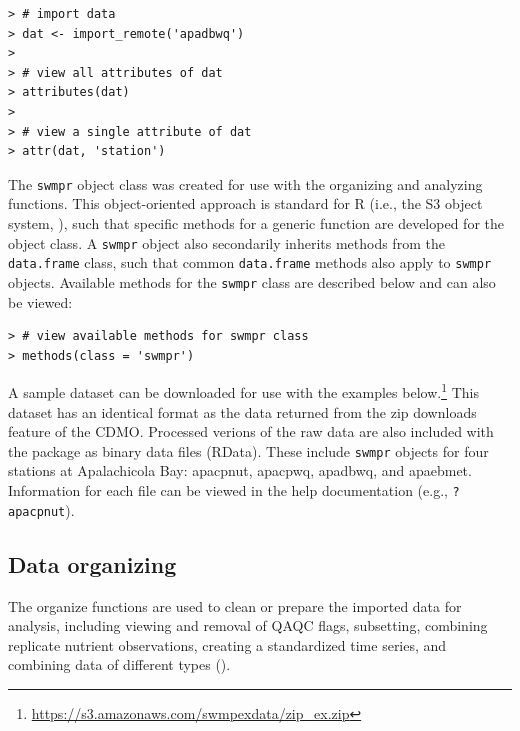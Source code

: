 \documentclass[10pt,letterpaper]{article}\usepackage[]{graphicx}\usepackage[]{color}
\makeatletter
\newenvironment{kframe}{%
 \def\at@end@of@kframe{}%
 \ifinner\ifhmode%
  \def\at@end@of@kframe{\end{minipage}}%
  \begin{minipage}{\columnwidth}%
 \fi\fi%
 \def\FrameCommand##1{\hskip\@totalleftmargin \hskip-\fboxsep
 \colorbox{shadecolor}{##1}\hskip-\fboxsep
     \hskip-\linewidth \hskip-\@totalleftmargin \hskip\columnwidth}%
 \MakeFramed {\advance\hsize-\width
   \@totalleftmargin\z@ \linewidth\hsize
   \@setminipage}}%
 {\par\unskip\endMakeFramed%
 \at@end@of@kframe}
\newenvironment{knitrout}{}{} %
\makeatother
\begin{document}
\begin{knitrout}\small
{}\color{fgcolor}\begin{kframe}
\begin{verbatim}
> # import data
> dat <- import_remote('apadbwq')
>  
> # view all attributes of dat
> attributes(dat)
>  
> # view a single attribute of dat
> attr(dat, 'station')
\end{verbatim}
\end{kframe}
\end{knitrout}
 
The \texttt{swmpr} object class was created for use with the organizing and analyzing functions.  This object-oriented approach is standard for R (i.e., the S3 object  system, \cite{Wickham14}), such that specific methods for a generic function are developed for the object class.  A \texttt{swmpr} object also secondarily inherits methods from the \texttt{data.frame} class, such that common \texttt{data.frame} methods also apply to \texttt{swmpr} objects.  Available methods for the \texttt{swmpr} class are described below and can also be viewed:
 
\begin{knitrout}\small
{}\color{fgcolor}\begin{kframe}
\begin{verbatim}
> # view available methods for swmpr class
> methods(class = 'swmpr')
\end{verbatim}
\end{kframe}
\end{knitrout}

A sample dataset can be downloaded for use with the examples below.\footnote{\url{https://s3.amazonaws.com/swmpexdata/zip_ex.zip}}  This dataset has an identical format as the data returned from the zip downloads feature of the \ac{CDMO}.  Processed verions of the raw data are also included with the package as binary data files (RData).  These include \texttt{swmpr} objects for four stations at Apalachicola Bay: apacpnut, apacpwq, apadbwq, and apaebmet.  Information for each file can be viewed in the help documentation (e.g., \texttt{?apacpnut}).

\subsection*{Data organizing}

The organize functions are used to clean or prepare the imported data for analysis, including viewing and removal of QAQC flags, subsetting, combining replicate nutrient observations, creating a standardized time series, and combining data of different types ().
\end{document}
